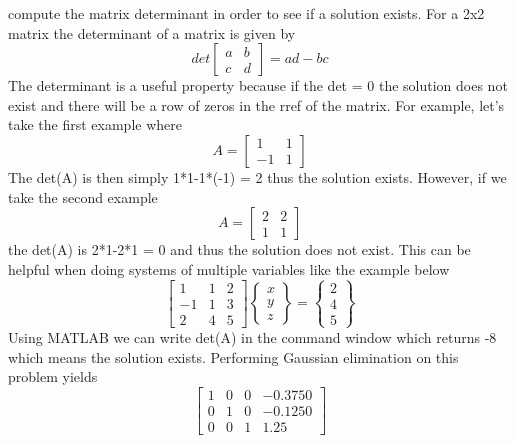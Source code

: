 \begin{enumerate}
compute the matrix determinant in order to see if a solution
exists. For a 2x2 matrix the determinant of a matrix is given by
\begin{equation}
det\begin{bmatrix} a & b \\ c & d \end{bmatrix} = ad-bc
\end{equation}
The determinant is a useful property because if the det = 0 the
solution does not exist and there will be a row of zeros in the rref
of the matrix. For example, let's take the first example where
\begin{equation}
A = \begin{bmatrix} 1 & 1 \\ -1 & 1 \end{bmatrix} 
\end{equation}
The det(A) is then simply 1*1-1*(-1) = 2 thus the solution
exists. However, if we take the second example
\begin{equation}
A = \begin{bmatrix} 2 & 2 \\ 1 & 1 \end{bmatrix} 
\end{equation}
the det(A) is 2*1-2*1 = 0 and thus the solution does not exist. This
can be helpful when doing systems of multiple variables like the
example below
\begin{equation}
\begin{bmatrix} 1 & 1 & 2\\ -1 & 1 & 3 \\ 2 & 4 & 5\end{bmatrix}
\begin{Bmatrix} x \\ y \\ z \end{Bmatrix} = 
\begin{Bmatrix} 2 \\ 4 \\ 5\end{Bmatrix}
\end{equation}
Using MATLAB we can write det(A) in the command window which returns
-8 which means the solution exists. Performing Gaussian elimination on
this problem yields
\begin{equation}
\begin{bmatrix} 1 & 0 & 0 & -0.3750 \\ 0 & 1 & 0 & -0.1250 \\ 0 & 0 &
  1 & 1.25 \end{bmatrix}

\end{equation}
\end{enumerate}
